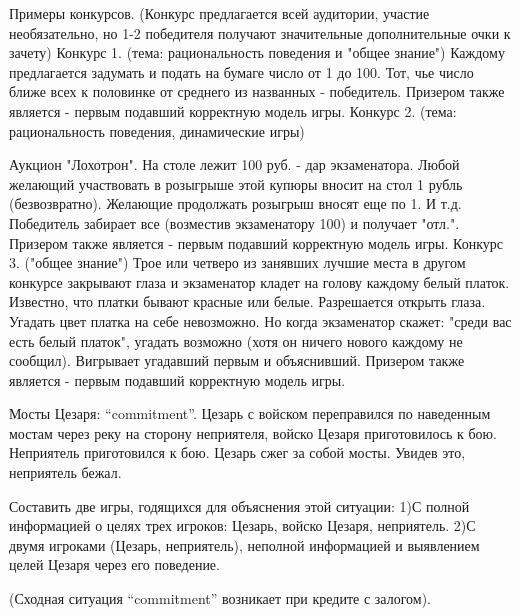 \documentclass[a4paper,12pt]{article}
\begin{document}
Примеры конкурсов. (Конкурс предлагается всей
аудитории, участие необязательно, но 1-2 победителя
получают значительные дополнительные очки к зачету)
Конкурс 1. (тема: рациональность поведения и "общее
знание") Каждому предлагается задумать и подать на
бумаге число от 1 до 100. Тот, чье число ближе всех
к половинке от среднего из названных - победитель.
Призером также является - первым подавший
корректную модель игры. Конкурс 2. (тема:
рациональность поведения, динамические игры)

Аукцион "Лохотрон". На столе лежит 100 руб. - дар
экзаменатора. Любой желающий участвовать в
розыгрыше этой купюры вносит на стол 1 рубль
(безвозвратно). Желающие продолжать розыгрыш вносят
еще по 1. И т.д. Победитель забирает все (возместив
экзаменатору 100) и получает "отл.". Призером также
является - первым подавший корректную модель игры.
Конкурс 3. ("общее знание") Трое или четверо из
занявших лучшие места в другом конкурсе закрывают
глаза и экзаменатор кладет на голову каждому белый
платок. Известно, что платки бывают красные или
белые. Разрешается открыть глаза. Угадать цвет
платка на себе невозможно. Но когда экзаменатор
скажет: "среди вас есть белый платок", угадать
возможно (хотя он ничего нового каждому не
сообщил). Вигрывает угадавший первым и объяснивший.
Призером также является - первым подавший
корректную модель игры.


\begin{exmp}\rm
{\rm Мосты Цезаря: ``commitment''.} Цезарь с войском
переправился по наведенным мостам через реку на сторону
неприятеля, войско Цезаря приготовилось к бою. Неприятель
приготовился к бою. Цезарь сжег за собой мосты. Увидев это,
неприятель бежал.

Составить две игры, годящихся для объяснения этой ситуации:
1)С полной информацией о целях трех игроков: Цезарь, войско
Цезаря, неприятель. 2)С двумя игроками (Цезарь,
неприятель), неполной информацией и выявлением целей Цезаря
через его поведение.

(Сходная ситуация ``commitment'' возникает при кредите с
залогом).
\end{exmp}
\end{document}
